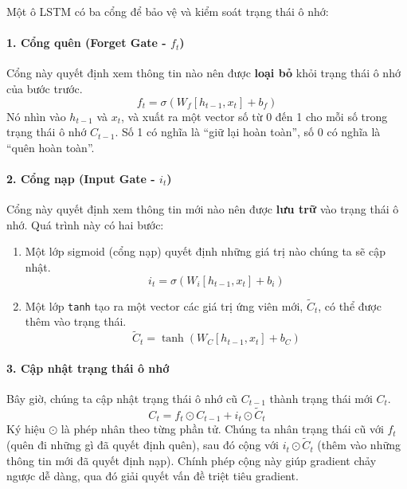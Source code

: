 \begin{center}
    \label{fig:lstm_cell_diagram}
\end{center}

Một ô LSTM có ba cổng để bảo vệ và kiểm soát trạng thái ô nhớ:

\paragraph{1. Cổng quên (Forget Gate - $f_t$)}
Cổng này quyết định xem thông tin nào nên được \textbf{loại bỏ} khỏi trạng thái ô nhớ của bước trước.
$$ f_t = \sigma(W_f [h_{t-1}, x_t] + b_f) $$
Nó nhìn vào $h_{t-1}$ và $x_t$, và xuất ra một vector số từ 0 đến 1 cho mỗi số trong trạng thái ô nhớ $C_{t-1}$. Số 1 có nghĩa là “giữ lại hoàn toàn”, số 0 có nghĩa là “quên hoàn toàn”.

\paragraph{2. Cổng nạp (Input Gate - $i_t$)}
Cổng này quyết định xem thông tin mới nào nên được \textbf{lưu trữ} vào trạng thái ô nhớ. Quá trình này có hai bước:
\begin{enumerate}
    \item Một lớp sigmoid (cổng nạp) quyết định những giá trị nào chúng ta sẽ cập nhật.
        $$ i_t = \sigma(W_i [h_{t-1}, x_t] + b_i) $$
    \item Một lớp \texttt{tanh} tạo ra một vector các giá trị ứng viên mới, $\tilde{C}_t$, có thể được thêm vào trạng thái.
        $$ \tilde{C}_t = \tanh(W_C [h_{t-1}, x_t] + b_C) $$
\end{enumerate}

\paragraph{3. Cập nhật trạng thái ô nhớ}
Bây giờ, chúng ta cập nhật trạng thái ô nhớ cũ $C_{t-1}$ thành trạng thái mới $C_t$.
$$ C_t = f_t \odot C_{t-1} + i_t \odot \tilde{C}_t $$
Ký hiệu $\odot$ là phép nhân theo từng phần tử. Chúng ta nhân trạng thái cũ với $f_t$ (quên đi những gì đã quyết định quên), sau đó cộng với $i_t \odot \tilde{C}_t$ (thêm vào những thông tin mới đã quyết định nạp). Chính phép cộng này giúp gradient chảy ngược dễ dàng, qua đó giải quyết vấn đề triệt tiêu gradient.

